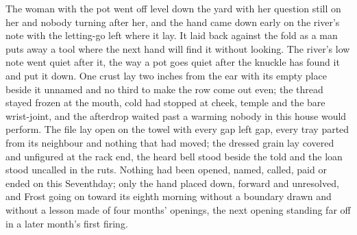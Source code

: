 The woman with the pot went off level down the yard with her question still on her and nobody turning after her, and the hand came down early on the river's note with the letting-go left where it lay. It laid back against the fold as a man puts away a tool where the next hand will find it without looking. The river's low note went quiet after it, the way a pot goes quiet after the knuckle has found it and put it down. One crust lay two inches from the ear with its empty place beside it unnamed and no third to make the row come out even; the thread stayed frozen at the mouth, cold had stopped at cheek, temple and the bare wrist-joint, and the afterdrop waited past a warming nobody in this house would perform. The file lay open on the towel with every gap left gap, every tray parted from its neighbour and nothing that had moved; the dressed grain lay covered and unfigured at the rack end, the heard bell stood beside the told and the loan stood uncalled in the ruts. Nothing had been opened, named, called, paid or ended on this Seventhday; only the hand placed down, forward and unresolved, and Frost going on toward its eighth morning without a boundary drawn and without a lesson made of four months' openings, the next opening standing far off in a later month's first firing.
